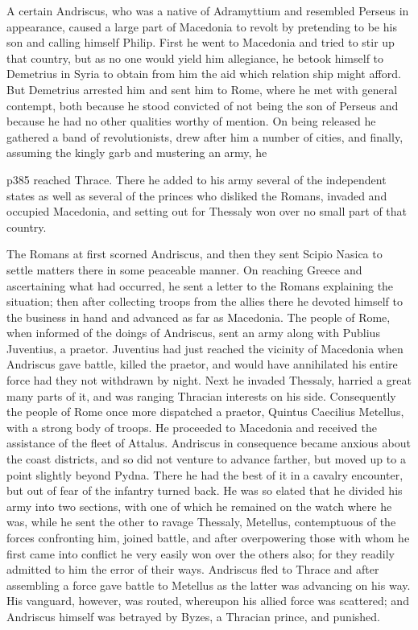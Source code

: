 A certain Andriscus, who was a native of Adramyttium and resembled Perseus in appearance, caused a large part of Macedonia to revolt by pretending to be his son and calling himself Philip. First he went to Macedonia and tried to stir up that country, but as no one would yield him allegiance, he betook himself to Demetrius in Syria to obtain from him the aid which relation ­ship might afford. But Demetrius arrested him and sent him to Rome, where he met with general contempt, both because he stood convicted of not being the son of Perseus and because he had no other qualities worthy of mention. On being released he gathered a band of revolutionists, drew after him a number of cities, and finally, assuming the kingly garb and mustering an army, he

p385 reached Thrace. There he added to his army several of the independent states as well as several of the princes who disliked the Romans, invaded and occupied Macedonia, and setting out for Thessaly won over no small part of that country.

The Romans at first scorned Andriscus, and then they sent Scipio Nasica to settle matters there in some peaceable manner. On reaching Greece and ascertaining what had occurred, he sent a letter to the Romans explaining the situation; then after collecting troops from the allies there he devoted himself to the business in hand and advanced as far as Macedonia. The people of Rome, when informed of the doings of Andriscus, sent an army along with Publius Juventius, a praetor. Juventius had just reached the vicinity of Macedonia when Andriscus gave battle, killed the praetor, and would have annihilated his entire force had they not withdrawn by night. Next he invaded Thessaly, harried a great many parts of it, and was ranging Thracian interests on his side. Consequently the people of Rome once more dispatched a praetor, Quintus Caecilius Metellus, with a strong body of troops. He proceeded to Macedonia and received the assistance of the fleet of Attalus. Andriscus in consequence became anxious about the coast districts, and so did not venture to advance farther, but moved up to a point slightly beyond Pydna. There he had the best of it in a cavalry encounter, but out of fear of the infantry turned back. He was so elated that he divided his army into two sections, with one of which he remained on the watch where he was, while he sent the other to ravage Thessaly, Metellus, contemptuous of the forces confronting him, joined battle, and after over­powering those with whom he first came into conflict he very easily won over the others also; for they readily admitted to him the error of their ways. Andriscus fled to Thrace and after assembling a force gave battle to Metellus as the latter was advancing on his way. His vanguard, however, was routed, whereupon his allied force was scattered; and Andriscus himself was betrayed by Byzes, a Thracian prince, and punished.

